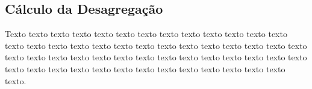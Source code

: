\subsection{Cálculo da Desagregação}
\label{sec:fundamentos}

Texto texto texto texto texto texto texto texto texto texto texto texto texto
texto texto texto texto texto texto texto texto texto texto texto texto texto
texto texto texto texto texto texto texto texto texto texto texto texto texto
texto texto texto texto texto texto texto texto texto texto texto texto texto
texto texto texto.


